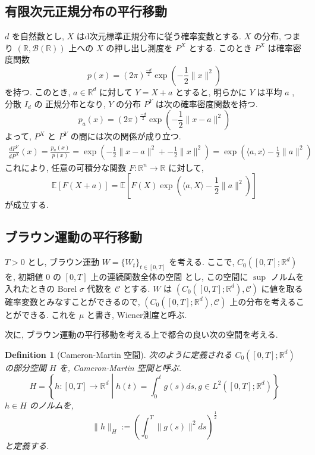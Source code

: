 \documentclass[11pt]{article}
\theoremstyle{breakstyle}
\newtheorem{definition}[theorem]{Definition}
\begin{document}
\subsection{有限次元正規分布の平行移動}
$d$ を自然数とし, $X$ はd次元標準正規分布に従う確率変数とする.
$X$ の分布, つまり $(\mathbb{R},\mathcal{B}(\mathbb{R}))$ 上への $X$ の押し出し測度を $P^X$ とする.
このとき $P^X$ は確率密度関数
\begin{equation*}
    p(x)=\left(2\pi\right)^{\frac{-d}{2}}\exp\left(-\frac{1}{2}\|x\|^2\right)
\end{equation*}
を持つ. このとき, $a\in \mathbb{R}^d$ に対して $Y=X+a$ とすると, 明らかに $Y$ は平均 $a$ , 分散 $I_d$ の
正規分布となり, $Y$ の分布 $P^Y$ は次の確率密度関数を持つ.
\begin{equation*}
    p_a(x)=\left(2\pi\right)^{\frac{-d}{2}}\exp\left(-\frac{1}{2}\|x-a\|^2\right)
\end{equation*}
よって, $P^X$ と $P^Y$ の間には次の関係が成り立つ.
\begin{align*}
    \frac{dP^Y}{dP^X}(x)=\frac{p_a(x)}{p(x)}=\exp\left(-\frac{1}{2}\|x-a\|^2+-\frac{1}{2}\|x\|^2\right)=\exp\left(\langle a,x\rangle-\frac{1}{2}\|a\|^2\right)
\end{align*}
これにより, 任意の可積分な関数 $F:\mathbb{R}^n\rightarrow\mathbb{R}$ に対して, 
\begin{equation*}
    \mathbb{E}\left[F(X+a)\right]=\mathbb{E}\left[F(X)\exp\left(\langle a,X\rangle-\frac{1}{2}\|a\|^2\right)\right]
\end{equation*}
が成立する.
\subsection{ブラウン運動の平行移動}
$T>0$ とし, ブラウン運動 $W=\{W_t\}_{t\in[0,T]}$ を考える. ここで, $C_0([0,T];\mathbb{R}^d)$ を, 初期値 $0$ の $[0,T]$ 上の連続関数全体の空間
とし, この空間に $\sup$ ノルムを入れたときの Borel $\sigma$ 代数を $\mathcal{C}$ とする.
$W$ は $(C_0([0,T];\mathbb{R}^d),\mathcal{C})$ に値を取る確率変数とみなすことができるので, 
$(C_0([0,T];\mathbb{R}^d),\mathcal{C})$ 上の分布を考えることができる.
これを $\mu$ と書き, Wiener測度と呼ぶ.

次に, ブラウン運動の平行移動を考える上で都合の良い次の空間を考える.
\begin{definition}[Cameron-Martin 空間]
    次のように定義される $C_0([0,T];\mathbb{R}^d)$ の部分空間 $H$ を, Cameron-Martin 空間と呼ぶ.
    \begin{equation*}
        H=\left\{h:[0,T]\rightarrow \mathbb{R}^d \middle| h(t)=\int_{0}^{t}g(s)ds, g\in L^2([0,T];\mathbb{R}^d)\right\}
    \end{equation*}
    $h\in H$ のノルムを, 
    \begin{equation*}
        \|h\|_H:=\left(\int_{0}^{T}\|g(s)\|^2ds\right)^\frac{1}{2}
    \end{equation*}
    と定義する.
\end{definition}
\end{document}
